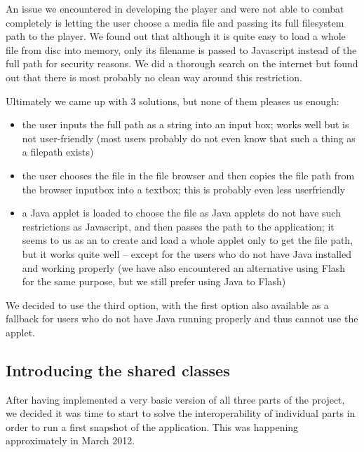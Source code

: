 
An issue we encountered in developing the player and were not able to combat completely is letting the user choose a media file and passing its full filesystem path to the player. We found out that although it is quite easy to load a whole file from disc into memory, only its filename is passed to Javascript instead of the full path for security reasons. We did a thorough search on the internet but found out that there is most probably no clean way around this restriction.

Ultimately we came up with 3 solutions, but none of them pleases us enough:

\begin{itemize}
\item the user inputs the full path as a string into an input box; works well but is not user-friendly (most users probably do not even know that such a thing as a filepath exists)

\item the user chooses the file in the file browser and then copies the file path from the browser inputbox into a textbox; this is probably even less userfriendly

\item a Java applet is loaded to choose the file as Java applets do not have such restrictions as Javascript, and then passes the path to the application; it seems to us as an  to create and load a whole applet only to get the file path, but it works quite well -- except for the users who do not have Java installed and working properly (we have also encountered an alternative using Flash for the same purpose, but we still prefer using Java to Flash)
\end{itemize}

We decided to use the third option, with the first option also available as a fallback for users who do not have Java running properly and thus cannot use the applet. 

\subsection{Introducing the shared classes}
\label{subsec:introducing_shared_classes}

After having implemented a very basic version of all three parts of the project, we decided it was time to start to solve the interoperability of individual parts in order to run a first snapshot of the application. This was happening approximately in March 2012.

